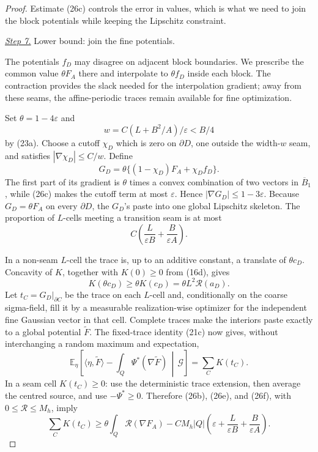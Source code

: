\documentclass{aomart}
\theoremstyle{definition}
\newcommand{\1}{\mathbf 1}
\begin{document}
\begin{proof}
Estimate (26c) controls the error in values, which is what we need to
join the block potentials while keeping the Lipschitz constraint.

\smallskip\noindent
\underline{\textit{Step 7.}} Lower bound: join the fine potentials.

The potentials $f_D$ may disagree on adjacent block boundaries.
We prescribe the common value $\theta F_A$ there and interpolate to
$\theta f_D$ inside each block.  The contraction provides the slack
needed for the interpolation gradient; away from these seams, the
affine-periodic traces remain available for fine optimization.

Set $\theta=1-4\varepsilon$ and
\begin{equation*}
w=C(L+B^2/A)/\varepsilon<B/4
\end{equation*}
by (23a).  Choose a cutoff $\chi_ D$ which is zero on $\partial D$,
one outside the width-$w$ seam, and satisfies
$|\nabla\chi_ D|\leq C/w$.  Define
\begin{equation}
G_ D=\theta\{(1-\chi_ D)F_ A+\chi_ D f_ D\}.
\tag{26d}
\end{equation}
The first part of its gradient is $\theta$ times a convex combination
of two vectors in $\overline B_ 1$, while (26c) makes the cutoff term
at most $\varepsilon$.  Hence $|\nabla G_ D|\leq1-3\varepsilon$.
Because $G_ D=\theta F_ A$ on every $\partial D$, the $G_ D$'s paste
into one global Lipschitz skeleton.  The proportion of $L$-cells
meeting a transition seam is at most
\begin{equation}
C\left(\frac{L}{\varepsilon B}
+\frac{B}{\varepsilon A}\right).
\tag{26e}
\end{equation}

In a non-seam $L$-cell the trace is, up to an additive constant, a
translate of $\theta c_ D$.  Concavity of $K$, together with
$K(0)\geq0$ from (16d), gives
\begin{equation}
K(\theta c_ D)\geq\theta K(c_ D)=\theta L^2\mathcal R(a_ D).
\tag{26f}
\end{equation}
Let $t_ C=G_ D|_ {\partial C}$ be the trace on each $L$-cell and,
conditionally on the coarse sigma-field, fill it by a measurable
realization-wise optimizer for the independent fine Gaussian vector in
that cell.  Complete traces make the interiors paste exactly to a global
potential $\widetilde F$.  The fixed-trace identity (21c) now gives,
without interchanging a random maximum and expectation,
\begin{equation}
\mathbb E_ \eta\!\left[
\langle\eta,\widetilde F\rangle-
\int_ Q\Psi^*(\nabla\widetilde F)\,\middle|\,\mathscr G\right]
=\sum_ CK(t_ C).
\tag{26g}
\end{equation}
In a seam cell $K(t_ C)\geq0$: use the deterministic trace extension,
then average the centred source, and use $-\Psi^*\geq0$.  Therefore
(26b), (26e), and (26f), with $0\leq \mathcal R\leq M_ h$, imply
\begin{equation}
\sum_ CK(t_ C)\geq\theta\int_ Q\mathcal R(\nabla F_ A)
-CM_ h|Q|\left(\varepsilon+\frac{L}{\varepsilon B}
+\frac{B}{\varepsilon A}\right).
\tag{26h}
\end{equation}


\end{proof}
\end{document}
